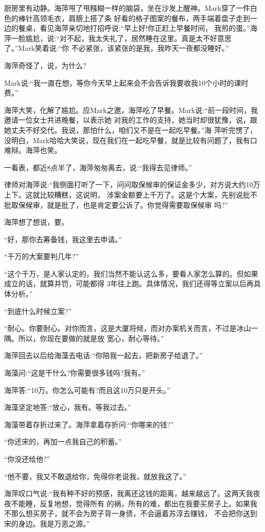 \documentclass[11pt,a4paper,onecolumn]{article}
\begin{document}
厨房里有动静。海萍甩了甩糨糊一样的脑袋，坐在沙发上醒神。Mark穿了一件白色的棒针高领毛衣，肩膀上搭了条
好看的格子图案的餐布，两手端着盘子走到一边的餐桌，看见海萍亲切地打招呼说:``早上好!你正赶上早餐时间，
我煎的蛋。''海萍一脸尴尬，说:``对不起，我太失礼了，居然睡在这里。真是太不好意思了。''Mark笑着说:``你
不必紧张，该紧张的是我，我昨天一夜都没睡好。''

海萍奇怪了，说，为什么?

Mark说:``我一直在想，等你今天早上起来会不会告诉我要收我10个小时的课时费。''

海萍大笑，化解了尴尬。应Mark之邀，海萍吃了早餐。Mark说:``前一段时间，我邀请一位女士共进晚餐，以表示她
对我的工作的支持，她当时却很犹豫，说，跟她丈夫不好交代。我说，那怕什么，咱们又不是在一起吃早餐。''海
萍听完愣了，没明白，Mark哈哈大笑说，现在我们在一起吃早餐，就是比较有问题了，我有口难辩。海萍也笑。

一看表，都近8点半了，海萍匆匆离去，说:``我得去见律师。''

律师对海萍说:``我侧面打听了一下，问问取保候审的保证金多少，对方说大约10万上下。这就比较糟糕，这说明，
涉案金额要上千万了。这是个大案，先别说批不批取保候审，就是批了，也是肯定要公诉了。你觉得需要取保候审
吗?''

海萍想了想说，要。

``好，那你去筹备钱，我这里去申请。''

``千万的大案要判几年?''

``这个千万，是人家认定的，我们当然不能认这么多，要看人家怎么算的。但如果成立的话，就算并罚，可能都得
3年往上跑。具体情况，我们还得等立案以后再具体分析。''

``到底什么时候立案?''

``耐心。你要耐心。对你而言，这是大厦将倾，而对办案机关而言，不过是冰山一隅。所以，你现在要做的就是放
宽心，耐心等待。''

海萍回去以后给海藻去电话:``你陪我一起去，把新房子给退了。''

海藻问:``这是干什么?你需要很多钱吗?我有。''

海萍答:``10万。你怎么可能有?而且这10万只是开头。''

海藻坚定地答:``放心，我有。等我过去。''

海藻带着存折过来了。海萍拿着存折问:``你哪来的钱?''

``你还宋的，再加一点我自己的积蓄。''

``你没还给他?''

``他不要，我又不敢退给你，免得你老说我，就放我这了。''

海萍叹口气说:``我有种不好的预感，我离还这钱的距离，越来越远了。这两天我夜夜不能睡，反复地想，觉得所有
的祸，所有的难，都出在我要买房子上。如果我不那么想买房子，就不会为房子背一身债，不会逼着苏淳去赚钱，
不会把你送到宋的身边。我是万恶之源。''
\end{document}
